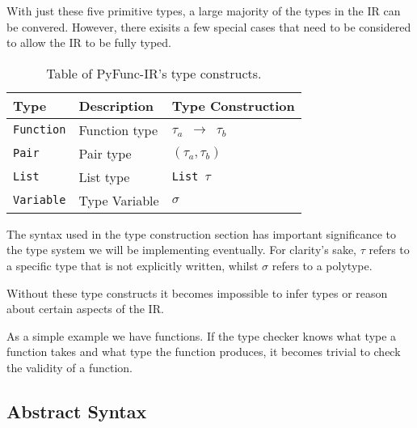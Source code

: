 \documentclass{l4proj}
\begin{document}
With just these five primitive types, a large majority of the types in the IR can be convered.
However, there exisits a few special cases that need to be considered to allow the IR to be fully typed.

\begin{table}[h]
\caption{Table of PyFunc-IR's type constructs.}
\label{tab:pyfunc-ir-type-constructs}
\begin{center}
\begin{tabular}{@{}|l|l|l|@{}}
    \hline
    \textbf{Type}        & \textbf{Description}      & \textbf{Type Construction}  \\
    \hline
    \texttt{Function}    & Function type             & \texttt{$\tau_a$ $\rightarrow$ $\tau_b$} \\
    \texttt{Pair}        & Pair type                 & \texttt{$(\tau_a, \tau_b)$} \\
    \texttt{List}        & List type                 & \texttt{List $\tau$} \\
    \texttt{Variable}    & Type Variable             & \texttt{$\sigma$} \\
    \hline
\end{tabular}
\end{center}
\end{table}

The syntax used in the type construction section has important significance to the type system we will be implementing eventually.
For clarity's sake, $\tau$ refers to a specific type that is not explicitly written, whilst $\sigma$ refers to a polytype. 

Without these type constructs it becomes impossible to infer types or reason about certain aspects of the IR.

As a simple example we have functions.
If the type checker knows what type a function takes and what type the function produces, it becomes trivial to check the validity of a function.


\subsection{Abstract Syntax}
\end{document}
